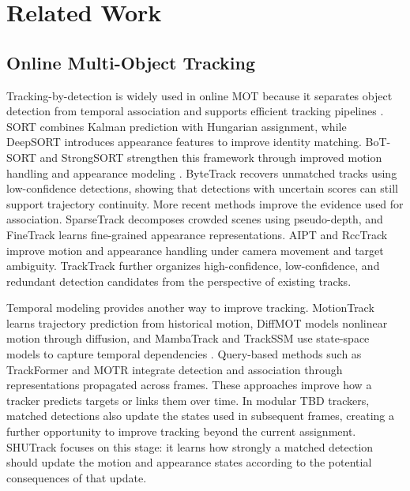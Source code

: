 \documentclass[a4paper,fleqn]{cas-sc}
\begin{document}
\section{Related Work}
\subsection{Online Multi-Object Tracking}
Tracking-by-detection is widely used in online MOT because it separates object detection from temporal association and supports efficient tracking pipelines \cite{ciaparrone2020deep}. SORT \cite{bewley2016simple} combines Kalman prediction with Hungarian assignment, while DeepSORT \cite{wojke2017simple} introduces appearance features to improve identity matching. BoT-SORT and StrongSORT strengthen this framework through improved motion handling and appearance modeling \cite{aharon2022bot,du2023strongsort}. ByteTrack \cite{zhang2022bytetrack} recovers unmatched tracks using low-confidence detections, showing that detections with uncertain scores can still support trajectory continuity. More recent methods improve the evidence used for association. SparseTrack \cite{liu2025sparsetrack} decomposes crowded scenes using pseudo-depth, and FineTrack \cite{ren2023focus} learns fine-grained appearance representations. AIPT \cite{zhang2024aipt} and RccTrack \cite{zhang2025robust} improve motion and appearance handling under camera movement and target ambiguity. TrackTrack \cite{shim2025focusing} further organizes high-confidence, low-confidence, and redundant detection candidates from the perspective of existing tracks.

Temporal modeling provides another way to improve tracking. MotionTrack \cite{xiao2024motiontrack} learns trajectory prediction from historical motion, DiffMOT \cite{lv2024diffmot} models nonlinear motion through diffusion, and MambaTrack and TrackSSM use state-space models to capture temporal dependencies \cite{xiao2024mambatrack,hu2026trackssm}. Query-based methods such as TrackFormer \cite{meinhardt2022trackformer} and MOTR \cite{zeng2022motr} integrate detection and association through representations propagated across frames. These approaches improve how a tracker predicts targets or links them over time. In modular TBD trackers, matched detections also update the states used in subsequent frames, creating a further opportunity to improve tracking beyond the current assignment. SHUTrack focuses on this stage: it learns how strongly a matched detection should update the motion and appearance states according to the potential consequences of that update.
\end{document}
